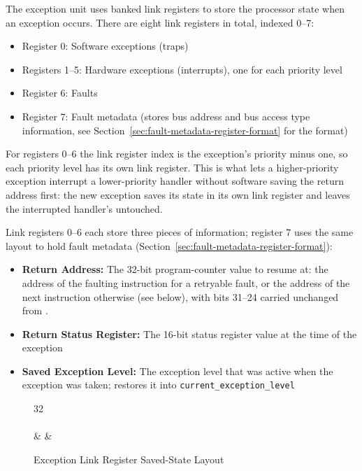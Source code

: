 The exception unit uses banked link registers to store the processor state when an exception occurs. There are eight
link registers in total, indexed 0--7:

\begin{itemize}
	\item Register 0: Software exceptions (traps)
	\item Registers 1--5: Hardware exceptions (interrupts), one for each priority level
	\item Register 6: Faults
	\item Register 7: Fault metadata (stores bus address and bus access type information, see
	      Section~\ref{sec:fault-metadata-register-format} for the format)
\end{itemize}

For registers 0--6 the link register index is the exception's priority minus one, so each priority level has its own
link register. This is what lets a higher-priority exception interrupt a lower-priority handler without software saving
the return address first: the new exception saves its state in its own link register and leaves the interrupted
handler's untouched.

Link registers 0--6 each store three pieces of information; register 7 uses the same layout to hold fault metadata
(Section~\ref{sec:fault-metadata-register-format}):

\begin{itemize}
	\item \textbf{Return Address:} The 32-bit program-counter value to resume at: the address of the faulting instruction
	      for a retryable fault, or the address of the next instruction otherwise (see below), with bits 31--24 carried
	      unchanged from .
	\item \textbf{Return Status Register:} The 16-bit status register value at the time of the exception
	\item \textbf{Saved Exception Level:} The exception level that was active when the exception was taken;
	       restores it into \texttt{current\_exception\_level}
\end{itemize}

\begin{figure}[H]
	\centering
	\begin{bytefield}[bitwidth=1.35em]{32}
		 \\
		 \\
		 &  & 
	\end{bytefield}
	\caption{Exception Link Register Saved-State Layout}
	\label{fig:exception-link-register-layout}
\end{figure}

